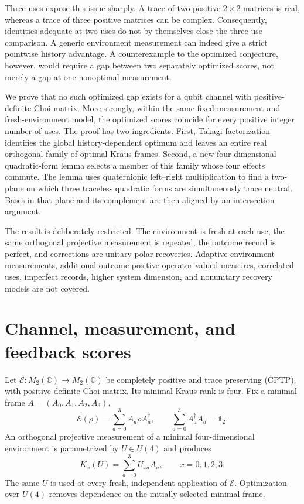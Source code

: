 \documentclass[11pt]{article}
\theoremstyle{remark}
\newcommand{\cE}{\mathcal{E}}
\newcommand{\C}{\mathbb{C}}
\newcommand{\one}{\mathbb{1}}
\begin{document}
Three uses expose this issue sharply.  A trace of two positive $2\times2$
matrices is real, whereas a trace of three positive matrices can be complex.
Consequently, identities adequate at two uses do not by themselves close the
three-use comparison.  A generic environment measurement can indeed give a
strict pointwise history advantage.  A counterexample to the optimized
conjecture, however, would require a gap between two separately optimized
scores, not merely a gap at one nonoptimal measurement.

We prove that no such optimized gap exists for a qubit channel with
positive-definite Choi matrix.  More strongly, within the same fixed-measurement
and fresh-environment model, the optimized scores coincide for every positive
integer number of uses.  The proof has two ingredients.  First, Takagi
factorization identifies the global history-dependent optimum and leaves an
entire real orthogonal family of optimal Kraus frames.  Second, a new
four-dimensional quadratic-form lemma selects a member of this family whose
four effects commute.  The lemma uses quaternionic left--right multiplication
to find a two-plane on which three traceless quadratic forms are simultaneously
trace neutral.  Bases in that plane and its complement are then aligned by an
intersection argument.

The result is deliberately restricted.  The environment is fresh at each use,
the same orthogonal projective measurement is repeated, the outcome record is
perfect, and corrections are unitary polar recoveries.  Adaptive environment
measurements, additional-outcome positive-operator-valued measures, correlated
uses, imperfect records, higher system dimension, and nonunitary recovery
models are not covered.

\section{Channel, measurement, and feedback scores}
\label{sec:model}

Let $\cE:M_2(\C)\to M_2(\C)$ be completely positive and trace preserving
(CPTP), with positive-definite Choi matrix.  Its minimal Kraus rank is four.
Fix a minimal frame $A=(A_0,A_1,A_2,A_3)$,
\begin{equation}
  \cE(\rho)=\sum_{a=0}^{3}A_a\rho A_a^\dagger,
  \qquad
  \sum_{a=0}^{3}A_a^\dagger A_a=\one_2 .
  \label{eq:kraus}
\end{equation}
An orthogonal projective measurement of a minimal four-dimensional environment
is parametrized by $U\in U(4)$ and produces
\begin{equation}
  K_x(U)=\sum_{a=0}^{3}U_{xa}A_a,
  \qquad x=0,1,2,3 .
  \label{eq:mix}
\end{equation}
The same $U$ is used at every fresh, independent application of $\cE$.
Optimization over $U(4)$ removes dependence on the initially selected minimal
frame.
\end{document}
